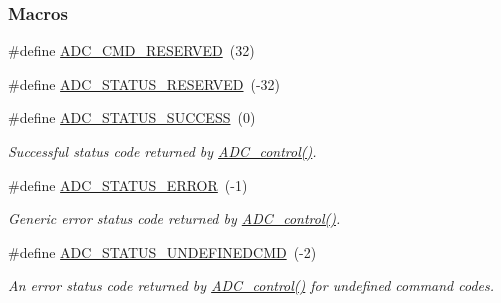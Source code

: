 \subsubsection*{Macros}
\begin{DoxyCompactItemize}
\item 
\#define \hyperlink{_a_d_c_8h_a1850e2c1e2791103d1102917d1e5b01b}{A\+D\+C\+\_\+\+C\+M\+D\+\_\+\+R\+E\+S\+E\+R\+V\+E\+D}~(32)
\item 
\#define \hyperlink{_a_d_c_8h_a5a8bd7786df22349b1a5434f48b08581}{A\+D\+C\+\_\+\+S\+T\+A\+T\+U\+S\+\_\+\+R\+E\+S\+E\+R\+V\+E\+D}~(-\/32)
\item 
\#define \hyperlink{_a_d_c_8h_aee02c8883a7e443d36ea47f9696730ec}{A\+D\+C\+\_\+\+S\+T\+A\+T\+U\+S\+\_\+\+S\+U\+C\+C\+E\+S\+S}~(0)
\begin{DoxyCompactList}\small\item\em Successful status code returned by \hyperlink{_a_d_c_8h_af4be7e5e4f5cc931f4501a542d689c32}{A\+D\+C\+\_\+control()}. \end{DoxyCompactList}\item 
\#define \hyperlink{_a_d_c_8h_a33ce323c3bbdc8a3f4e018f99a92b09d}{A\+D\+C\+\_\+\+S\+T\+A\+T\+U\+S\+\_\+\+E\+R\+R\+O\+R}~(-\/1)
\begin{DoxyCompactList}\small\item\em Generic error status code returned by \hyperlink{_a_d_c_8h_af4be7e5e4f5cc931f4501a542d689c32}{A\+D\+C\+\_\+control()}. \end{DoxyCompactList}\item 
\#define \hyperlink{_a_d_c_8h_a704a8cd95bdee94b0f61f06566062e8c}{A\+D\+C\+\_\+\+S\+T\+A\+T\+U\+S\+\_\+\+U\+N\+D\+E\+F\+I\+N\+E\+D\+C\+M\+D}~(-\/2)
\begin{DoxyCompactList}\small\item\em An error status code returned by \hyperlink{_a_d_c_8h_af4be7e5e4f5cc931f4501a542d689c32}{A\+D\+C\+\_\+control()} for undefined command codes. \end{DoxyCompactList}\end{DoxyCompactItemize}
